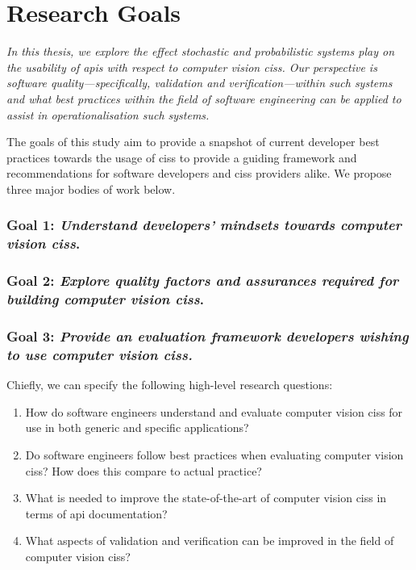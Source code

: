 \section{Research Goals}
\label{sec:introduction:goals}

\itshape
In this thesis, we explore the effect stochastic and probabilistic systems play on the usability of \glspl{api} with respect to computer vision \glspl{cis}. Our perspective is software quality---specifically, validation and verification---within such systems and what best practices within the field of software engineering can be applied to assist in operationalisation such systems.
\upshape

The goals of this study aim to provide a snapshot of current developer best practices towards the usage of \glspl{cis} to provide a guiding framework and recommendations for software developers and \glspl{cis} providers alike. We propose three major bodies of work below.

\subsubsection*{Goal 1: \textit{Understand developers' mindsets towards computer vision \glspl{cis}}.}

\subsubsection*{Goal 2: \textit{Explore quality factors and assurances required for building computer vision \glspl{cis}}.}

\subsubsection*{Goal 3: \textit{Provide an evaluation framework developers wishing to use computer vision \glspl{cis}.}}

Chiefly, we can specify the following high-level research questions:

\begin{enumerate}[label=\textbf{RQ\arabic*}., leftmargin=4\parindent]
  \item How do software engineers understand and evaluate computer vision \glspl{cis} for use in both generic and specific applications?
  \item Do software engineers follow best practices when evaluating computer vision \glspl{cis}? How does this compare to actual practice?
  \item What is needed to improve the state-of-the-art of computer vision \glspl{cis} in terms of \gls{api} documentation?
  \item What aspects of validation and verification can be improved in the field of computer vision \glspl{cis}?
\end{enumerate}

